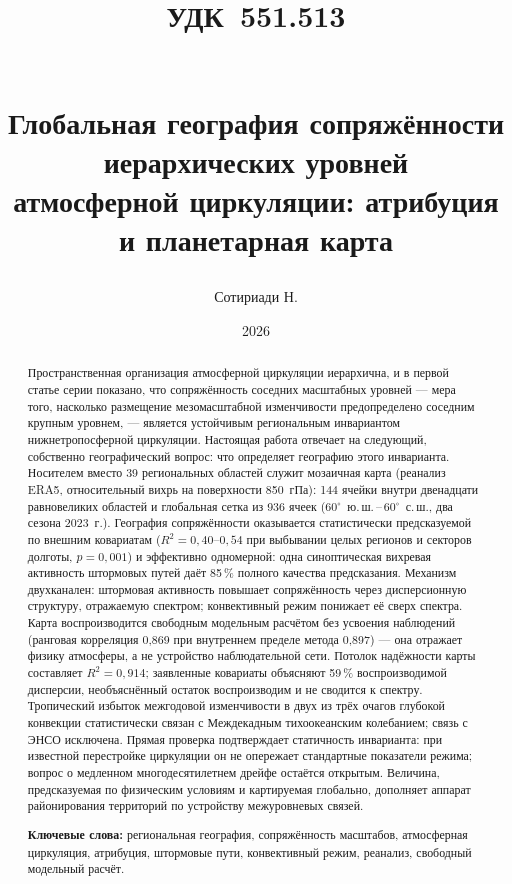 \documentclass[11pt,a4paper]{article}
\title{{\normalsize\normalfont\hspace*{-\leftskip}\parbox{\linewidth}{\raggedright УДК~551.513}}\\[1.5em]
Глобальная география сопряжённости иерархических уровней\\
атмосферной циркуляции: атрибуция и планетарная карта}
\author{Сотириади Н.}
\date{2026}
\begin{document}
\maketitle

\begin{abstract}
Пространственная организация атмосферной циркуляции иерархична, и в первой статье серии показано, что сопряжённость соседних масштабных уровней --- мера того, насколько размещение мезомасштабной изменчивости предопределено соседним крупным уровнем, --- является устойчивым региональным инвариантом нижнетропосферной циркуляции. Настоящая работа отвечает на следующий, собственно географический вопрос: что определяет географию этого инварианта. Носителем вместо 39 региональных областей служит мозаичная карта (реанализ ERA5, относительный вихрь на поверхности 850~гПа): 144 ячейки внутри двенадцати равновеликих областей и глобальная сетка из 936 ячеек ($60^\circ$~ю.\,ш.\,--\,$60^\circ$~с.\,ш., два сезона 2023~г.). География сопряжённости оказывается статистически предсказуемой по внешним ковариатам ($R^2=0{,}40$--$0{,}54$ при выбывании целых регионов и секторов долготы, $p=0{,}001$) и эффективно одномерной: одна синоптическая вихревая активность штормовых путей даёт 85\,\% полного качества предсказания. Механизм двухканален: штормовая активность повышает сопряжённость через дисперсионную структуру, отражаемую спектром; конвективный режим понижает её сверх спектра. Карта воспроизводится свободным модельным расчётом без усвоения наблюдений (ранговая корреляция 0,869 при внутреннем пределе метода 0,897) --- она отражает физику атмосферы, а не устройство наблюдательной сети. Потолок надёжности карты составляет $R^2=0{,}914$; заявленные ковариаты объясняют 59\,\% воспроизводимой дисперсии, необъяснённый остаток воспроизводим и не сводится к спектру. Тропический избыток межгодовой изменчивости в двух из трёх очагов глубокой конвекции статистически связан с Междекадным тихоокеанским колебанием; связь с ЭНСО исключена. Прямая проверка подтверждает статичность инварианта: при известной перестройке циркуляции он не опережает стандартные показатели режима; вопрос о медленном многодесятилетнем дрейфе остаётся открытым. Величина, предсказуемая по физическим условиям и картируемая глобально, дополняет аппарат районирования территорий по устройству межуровневых связей.

\smallskip
\noindent\textbf{Ключевые слова:} региональная география, сопряжённость масштабов, атмосферная циркуляция, атрибуция, штормовые пути, конвективный режим, реанализ, свободный модельный расчёт.
\end{abstract}
\end{document}
